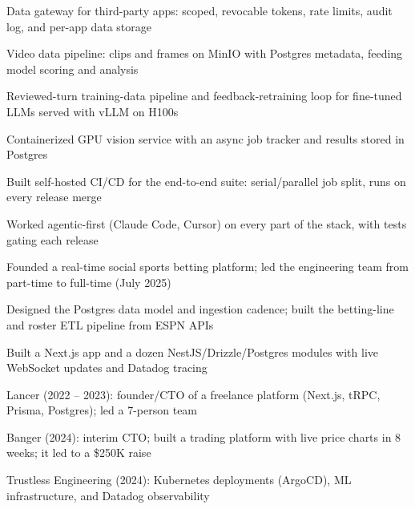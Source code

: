 \documentclass[print]{jack-resume}
\begin{document}
\begin{tightemize}
    \item Data gateway for third-party apps: scoped, revocable tokens, rate limits, audit log, and per-app data storage
    \item Video data pipeline: clips and frames on MinIO with Postgres metadata, feeding model scoring and analysis
    \item Reviewed-turn training-data pipeline and feedback-retraining loop for fine-tuned LLMs served with vLLM on H100s
    \item Containerized GPU vision service with an async job tracker and results stored in Postgres
    \item Built self-hosted CI/CD for the end-to-end suite: serial/parallel job split, runs on every release merge
    \item Worked agentic-first (Claude Code, Cursor) on every part of the stack, with tests gating each release
\end{tightemize}
\sectionsep

\begin{tightemize}
    \item Founded a real-time social sports betting platform; led the engineering team from part-time to full-time (July 2025)
    \item Designed the Postgres data model and ingestion cadence; built the betting-line and roster ETL pipeline from ESPN APIs
    \item Built a Next.js app and a dozen NestJS/Drizzle/Postgres modules with live WebSocket updates and Datadog tracing
\end{tightemize}
\sectionsep

\begin{tightemize}
    \item Lancer (2022 -- 2023): founder/CTO of a freelance platform (Next.js, tRPC, Prisma, Postgres); led a 7-person team
    \item Banger (2024): interim CTO; built a trading platform with live price charts in 8 weeks; it led to a \$250K raise
    \item Trustless Engineering (2024): Kubernetes deployments (ArgoCD), ML infrastructure, and Datadog observability
\end{tightemize}
\sectionsep
\end{document}
